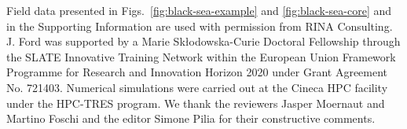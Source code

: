 \documentclass[se,manuscript]{copernicus}
\begin{document}


\begin{acknowledgements}
Field data presented in Figs.~\ref{fig:black-sea-example} and \ref{fig:black-sea-core} and in the Supporting Information are used with permission from RINA Consulting.
J. Ford was supported by a Marie Sk\l{}odowska-Curie Doctoral Fellowship through the {SLATE} Innovative Training Network within the European Union Framework Programme for Research and Innovation Horizon 2020 under Grant Agreement No. 721403.
Numerical simulations were carried out at the Cineca HPC facility under the HPC-TRES program.
We thank the reviewers Jasper Moernaut and Martino Foschi and the editor Simone Pilia for their constructive comments.

\end{acknowledgements}



\end{document}
